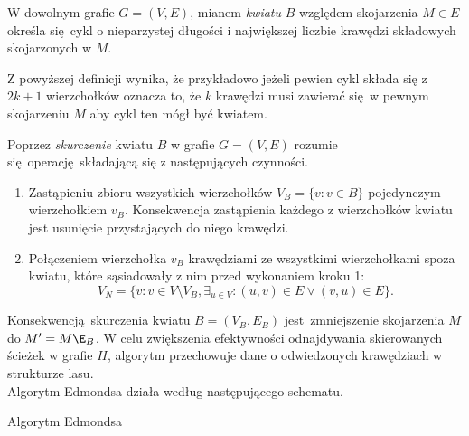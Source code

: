 \par{
  \begin{definition}
    W dowolnym grafie $G=(V, E)$, mianem \emph{kwiatu} $B$ względem skojarzenia $M \in E$ określa się cykl o nieparzystej długości i największej liczbie krawędzi składowych skojarzonych w $M$. 
  \end{definition}
  Z powyższej definicji wynika, że przykładowo jeżeli pewien cykl składa się z $2k + 1$ wierzchołków oznacza to, że $k$ krawędzi musi zawierać się w pewnym skojarzeniu $M$ aby cykl ten mógł być kwiatem.
  \begin{definition}
    Poprzez \emph{skurczenie} kwiatu $B$ w grafie $G=(V, E)$ rozumie się operację składającą się z następujących czynności.
    \begin{enumerate}
       \item Zastąpieniu zbioru wszystkich wierzchołków $V_B=\{v: v \in B\}$ pojedynczym wierzchołkiem $v_B$. Konsekwencja zastąpienia każdego z wierzchołków kwiatu jest usunięcie przystających do niego krawędzi.
       \item Połączeniem wierzchołka $v_B$ krawędziami ze wszystkimi wierzchołkami spoza kwiatu, które sąsiadowały z nim przed wykonaniem kroku 1: \[V_N=\{v: v \in V \setminus V_B, \exists_{u \in V}:(u,v)\in E \lor (v, u)\in E\}.\]
     \end{enumerate}
  \end{definition}
  Konsekwencją skurczenia kwiatu $B=(V_B, E_B)$ jest zmniejszenie skojarzenia $M$ do $M^\prime=M\E_B$.
  W celu zwiększenia efektywności odnajdywania skierowanych ścieżek w grafie $H$, algorytm przechowuje dane o odwiedzonych krawędziach w strukturze lasu.\\
  Algorytm Edmondsa działa według następującego schematu.
  \begin{algorithm}
    \caption{Algorytm Edmondsa}\label{alg_Edmonds}
    \begin{algorithmic}[1]



\end{algorithmic}
\end{algorithm}}
